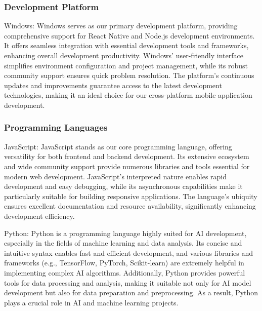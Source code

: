         \subsubsection{Development Platform}
            \begin{description}
                \item{Windows:}
                    Windows serves as our primary development platform, providing comprehensive support for React Native and Node.js development environments. It offers seamless integration with essential development tools and frameworks, enhancing overall development productivity. Windows' user-friendly interface simplifies environment configuration and project management, while its robust community support ensures quick problem resolution. The platform's continuous updates and improvements guarantee access to the latest development technologies, making it an ideal choice for our cross-platform mobile application development.
            \end{description}

        \subsubsection{Programming Languages} 
            \begin{description}
                \item{JavaScript:}
                    JavaScript stands as our core programming language, offering versatility for both frontend and backend development. Its extensive ecosystem and wide community support provide numerous libraries and tools essential for modern web development. JavaScript's interpreted nature enables rapid development and easy debugging, while its asynchronous capabilities make it particularly suitable for building responsive applications. The language's ubiquity ensures excellent documentation and resource availability, significantly enhancing development efficiency.
                \item{Python:}
                    Python is a programming language highly suited for AI development, especially in the fields of machine learning and data analysis. Its concise and intuitive syntax enables fast and efficient development, and various libraries and frameworks (e.g., TensorFlow, PyTorch, Scikit-learn) are extremely helpful in implementing complex AI algorithms. Additionally, Python provides powerful tools for data processing and analysis, making it suitable not only for AI model development but also for data preparation and preprocessing. As a result, Python plays a crucial role in AI and machine learning projects.
            \end{description}

